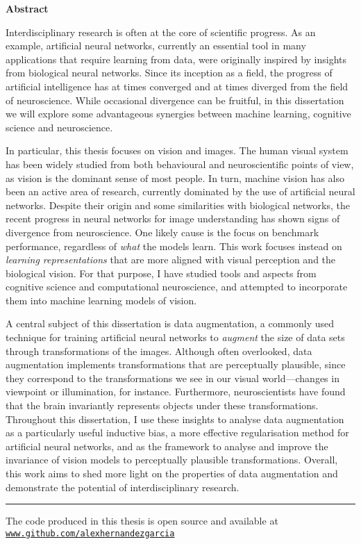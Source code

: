 {}
\begingroup
\vspace*{\fill}
	\begin{center} 
        \Large \textbf{Abstract}
	\vspace{15pt}
	\end{center}
Interdisciplinary research is often at the core of scientific progress. As an example, artificial neural networks, currently an essential tool in many applications that require learning from data, were originally inspired by insights from biological neural networks. Since its inception as a field, the progress of artificial intelligence has at times converged and at times diverged from the field of neuroscience. While occasional divergence can be fruitful, in this dissertation we will explore some advantageous synergies between machine learning, cognitive science and neuroscience.

In particular, this thesis focuses on vision and images. The human visual system has been widely studied from both behavioural and neuroscientific points of view, as vision is the dominant sense of most people. In turn, machine vision has also been an active area of research, currently dominated by the use of artificial neural networks. Despite their origin and some similarities with biological networks, the recent progress in neural networks for image understanding has shown signs of divergence from neuroscience. One likely cause is the focus on benchmark performance, regardless of \textit{what} the models learn. This work focuses instead on \textit{learning representations} that are more aligned with visual perception and the biological vision. For that purpose, I have studied tools and aspects from cognitive science and computational neuroscience, and attempted to incorporate them into machine learning models of vision.

A central subject of this dissertation is data augmentation, a commonly used technique for training artificial neural networks to \textit{augment} the size of data sets through transformations of the images. Although often overlooked, data augmentation implements transformations that are perceptually plausible, since they correspond to the transformations we see in our visual world---changes in viewpoint or illumination, for instance. Furthermore, neuroscientists have found that the brain invariantly represents objects under these transformations. Throughout this dissertation, I use these insights to analyse data augmentation as a particularly useful inductive bias, a more effective regularisation method for artificial neural networks, and as the framework to analyse and improve the invariance of vision models to perceptually plausible transformations. Overall, this work aims to shed more light on the properties of data augmentation and demonstrate the potential of interdisciplinary research.
\par\vspace{30pt}
\noindent\rule{\linewidth}{0.1mm}\vspace{5pt} %
\small{The code produced in this thesis is open source and available at \href{https://github.com/alexhernandezgarcia}{\texttt{www.github.com/alexhernandezgarcia}}}
\vspace*{\fill}
\endgroup
